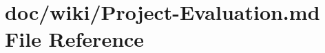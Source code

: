 \hypertarget{_project-_evaluation_8md}{}\section{doc/wiki/\+Project-\/\+Evaluation.md File Reference}
\label{_project-_evaluation_8md}
